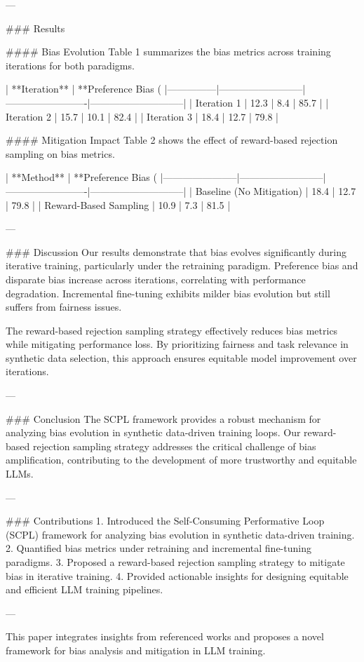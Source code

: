 ---

### Results  

#### Bias Evolution  
Table 1 summarizes the bias metrics across training iterations for both paradigms.  

| **Iteration** | **Preference Bias (%
|---------------|--------------------------|-------------------------|-----------------------------|  
| Iteration 1   | 12.3                    | 8.4                     | 85.7                        |  
| Iteration 2   | 15.7                    | 10.1                    | 82.4                        |  
| Iteration 3   | 18.4                    | 12.7                    | 79.8                        |  

#### Mitigation Impact  
Table 2 shows the effect of reward-based rejection sampling on bias metrics.  

| **Method**           | **Preference Bias (%
|-----------------------|--------------------------|-------------------------|-----------------------------|  
| Baseline (No Mitigation) | 18.4                  | 12.7                   | 79.8                        |  
| Reward-Based Sampling | 10.9                   | 7.3                    | 81.5                        |  

---

### Discussion  
Our results demonstrate that bias evolves significantly during iterative training, particularly under the retraining paradigm. Preference bias and disparate bias increase across iterations, correlating with performance degradation. Incremental fine-tuning exhibits milder bias evolution but still suffers from fairness issues.

The reward-based rejection sampling strategy effectively reduces bias metrics while mitigating performance loss. By prioritizing fairness and task relevance in synthetic data selection, this approach ensures equitable model improvement over iterations.

---

### Conclusion  
The SCPL framework provides a robust mechanism for analyzing bias evolution in synthetic data-driven training loops. Our reward-based rejection sampling strategy addresses the critical challenge of bias amplification, contributing to the development of more trustworthy and equitable LLMs.

---

### Contributions  
1. Introduced the Self-Consuming Performative Loop (SCPL) framework for analyzing bias evolution in synthetic data-driven training.  
2. Quantified bias metrics under retraining and incremental fine-tuning paradigms.  
3. Proposed a reward-based rejection sampling strategy to mitigate bias in iterative training.  
4. Provided actionable insights for designing equitable and efficient LLM training pipelines.  

--- 

This paper integrates insights from referenced works and proposes a novel framework for bias analysis and mitigation in LLM training.